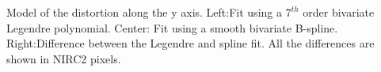 Model of the distortion along the y axis.  Left:Fit using a $7^{th}$ order bivariate Legendre polynomial.  Center: Fit using a smooth bivariate B-spline. Right:Difference between the Legendre and spline fit.  All the differences are shown in NIRC2 pixels.  \label{dist_y}